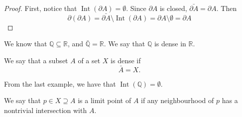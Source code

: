 \documentclass[notoc,notitlepage]{tufte-book}
\DeclareMathOperator{\Int}{Int}
\begin{document}
\begin{proof}
  First, notice that $\Int(\partial A) = \emptyset$.
  Since $\partial A$ is closed, $\bar{\partial A} = \partial A$.
  Then
  \begin{equation*}
    \partial ( \partial A ) = \bar{\partial A} \setminus \Int(\partial A)
      = \partial A \setminus \emptyset = \partial A
  \end{equation*}
\end{proof}

\begin{eg}
  We know that $\mathbb{Q} \subseteq \mathbb{R}$,
  and $\bar{\mathbb{Q}} = \mathbb{R}$.
  We say that $\mathbb{Q}$ is dense in $\mathbb{R}$.
\end{eg}

\begin{defn}[Dense]\label{defn:dense}
  We say that a subset $A$ of a set $X$ is dense if
  \begin{equation*}
    \bar{A} = X.
  \end{equation*}
\end{defn}

\begin{eg}
  From the last example, we have that $\Int(\mathbb{Q}) = \emptyset$.
\end{eg}

\begin{defn}\label{defn:limit_point}
  We say that $p \in X \supseteq A$ is a limit point of $A$
  if any neighbourhood of $p$ has a nontrivial intersection
  with $A$.
\end{defn}
\end{document}
